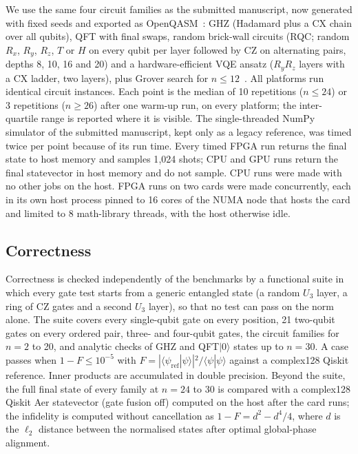 \documentclass[pdflatex,sn-mathphys-num]{sn-jnl}
\theoremstyle{thmstyleone}
\theoremstyle{thmstylethree}
\begin{document}
We use the same four circuit families as the submitted manuscript, now generated with fixed seeds and exported as OpenQASM~\cite{cross2017openqasm}: GHZ (Hadamard plus a CX chain over all qubits), QFT with final swaps, random brick-wall circuits (RQC; random $R_x$, $R_y$, $R_z$, $T$ or $H$ on every qubit per layer followed by CZ on alternating pairs, depths 8, 10, 16 and 20) and a hardware-efficient VQE ansatz ($R_y R_z$ layers with a CX ladder, two layers), plus Grover search for $n\leq 12$~\cite{grover1996fast,peruzzo2014variational,boixo2018characterizing}. All platforms run identical circuit instances. Each point is the median of 10 repetitions ($n\leq 24$) or 3 repetitions ($n\geq 26$) after one warm-up run, on every platform; the inter-quartile range is reported where it is visible. The single-threaded NumPy simulator of the submitted manuscript, kept only as a legacy reference, was timed twice per point because of its run time. Every timed FPGA run returns the final state to host memory and samples 1{,}024 shots; CPU and GPU runs return the final statevector in host memory and do not sample. CPU runs were made with no other jobs on the host. FPGA runs on two cards were made concurrently, each in its own host process pinned to 16 cores of the NUMA node that hosts the card and limited to 8 math-library threads, with the host otherwise idle.

\subsection{Correctness}\label{subsec:correctness-method}

Correctness is checked independently of the benchmarks by a functional suite in which every gate test starts from a generic entangled state (a random $U_3$ layer, a ring of CZ gates and a second $U_3$ layer), so that no test can pass on the norm alone. The suite covers every single-qubit gate on every position, 21 two-qubit gates on every ordered pair, three- and four-qubit gates, the circuit families for $n=2$ to 20, and analytic checks of GHZ and QFT$|0\rangle$ states up to $n=30$. A case passes when $1-F\leq 10^{-5}$ with $F=|\langle\psi_\mathrm{ref}|\psi\rangle|^2/\langle\psi|\psi\rangle$ against a complex128 Qiskit reference. Inner products are accumulated in double precision. Beyond the suite, the full final state of every family at $n=24$ to 30 is compared with a complex128 Qiskit Aer statevector (gate fusion off) computed on the host after the card runs; the infidelity is computed without cancellation as $1-F=d^2-d^4/4$, where $d$ is the $\ell_2$ distance between the normalised states after optimal global-phase alignment.
\end{document}
